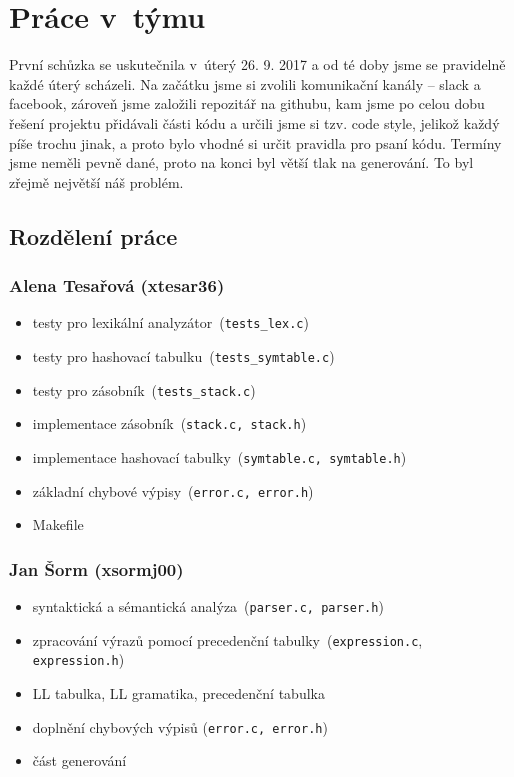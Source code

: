 \documentclass[11pt,a4paper]{article}
\begin{document}
\section{Práce v~týmu}
První schůzka se uskutečnila v~úterý 26. 9. 2017 a od té doby jsme se pravidelně každé úterý scházeli. Na začátku jsme si zvolili komunikační kanály -- slack a facebook, zároveň jsme založili repozitář na githubu, kam jsme po celou dobu řešení projektu přidávali části kódu a určili jsme si tzv. code style, jelikož každý píše trochu jinak, a proto bylo vhodné si určit pravidla pro psaní kódu. Termíny jsme neměli pevně dané, proto na konci byl větší tlak na generování. To byl zřejmě největší náš problém. \\

\subsection{Rozdělení práce}

\subsubsection*{Alena Tesařová (xtesar36)}
\begin{itemize}
\setlength\itemsep{0.3em}
\item testy pro lexikální analyzátor\ (\verb|tests_lex.c|) 
\item testy pro hashovací tabulku\ (\verb|tests_symtable.c|)
\item testy pro zásobník\ (\verb|tests_stack.c|) 
\item implementace zásobník\ (\verb|stack.c, stack.h|) 
\item implementace hashovací tabulky\ (\verb|symtable.c, symtable.h|)
\item základní chybové výpisy\ (\verb|error.c, error.h|) 
\item Makefile
\end{itemize}

\subsubsection*{Jan Šorm (xsormj00)}
\begin{itemize}
\setlength\itemsep{0.3em}
\item syntaktická a sémantická analýza\ (\verb|parser.c, parser.h|) 
\item zpracování výrazů pomocí precedenční tabulky\ (\verb|expression.c|, \verb|expression.h|) 
\item LL tabulka, LL gramatika, precedenční tabulka
\item doplnění chybových výpisů (\verb|error.c, error.h|) 
\item část generování
\end{itemize}
\end{document}
